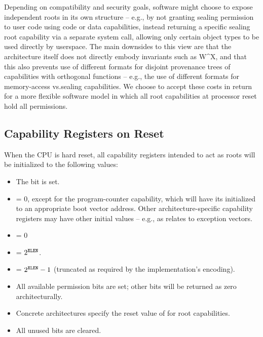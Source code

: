Depending on compatibility and security goals, software might choose to expose
independent roots in its own structure -- e.g., by not granting sealing
permission to user code using code or data capabilities, instead returning
a specific sealing root capability via a separate system call, allowing only
certain object types to be used directly by userspace.
The main downsides to this view are that the architecture itself does not
directly embody invariants such as W\^{}X, and that this also prevents use of
different formats for disjoint provenance trees of capabilities with orthogonal
functions -- e.g., the use of different formats for memory-access vs.\@ sealing
capabilities.
We choose to accept these costs in return for a more flexible software model
in which all root capabilities at processor reset hold all permissions.

\subsection{Capability Registers on Reset}

When the CPU is hard reset, all capability registers intended to act as roots
will be initialized to the following values:

\begin{itemize}
\item
The \ctag{} bit is set.
\item
\coffset{} = 0, except for the program-counter capability, which will have its
\coffset{} initialized to an appropriate boot vector address.
Other architecture-specific capability registers may have other initial values
-- e.g., as relates to exception vectors.
\item
\cbase{} = 0
\item
\clength{} = $2^{{\texttt{XLEN}}{}}$.
\item
\cotype{} = $2^{{\texttt{XLEN}}{}}-1$ (truncated as required by the implementation's encoding).
\item
All available permission bits are set; other bits will be returned as zero
architecturally.
\item
Concrete architectures specify the reset value of \cflags{} for root capabilities.
\item
All unused bits are cleared.
\end{itemize}

